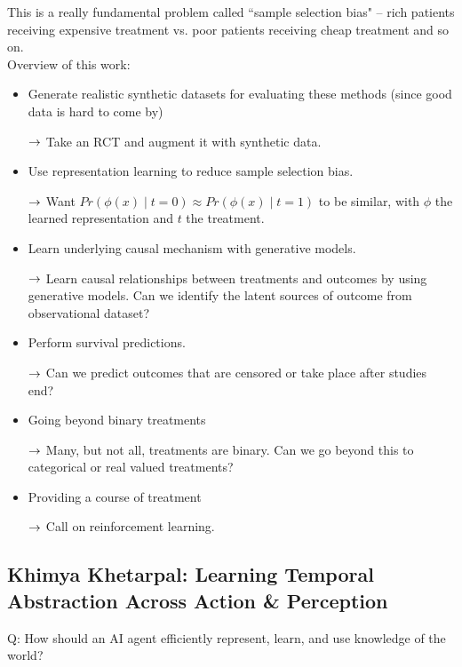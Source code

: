 This is a really fundamental problem called ``sample selection bias" -- rich patients receiving expensive treatment vs. poor patients receiving cheap treatment and so on. \\

Overview of this work:
\begin{itemize}
    \item Generate realistic synthetic datasets for evaluating these methods (since good data is hard to come by)
    
    $\rightarrow$ Take an RCT and augment it with synthetic data.
    
    \item Use representation learning to reduce sample selection bias.
    
    $\rightarrow$ Want $Pr(\phi(x) \mid t=0) \approx Pr(\phi(x) \mid t=1)$ to be similar, with $\phi$ the learned representation and $t$ the treatment.
    
    \item Learn underlying causal mechanism with generative models.
    
    $\rightarrow$ Learn causal relationships between treatments and outcomes by using generative models. Can we identify the latent sources of outcome from observational dataset?
    
    \item Perform survival predictions.
    
    $\rightarrow$ Can we predict outcomes that are censored or take place after studies end?
    
    \item Going beyond binary treatments
    
    $\rightarrow$ Many, but not all, treatments are binary. Can we go beyond this to categorical or real valued treatments?
    
    \item Providing a course of treatment
    
    $\rightarrow$ Call on reinforcement learning.

\end{itemize}



\spacerule
\subsection{Khimya Khetarpal: Learning Temporal Abstraction Across Action \& Perception}

Q: How should an AI agent efficiently represent, learn, and use knowledge of the world? \\

